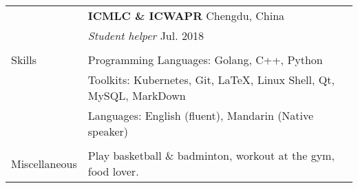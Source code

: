 \documentclass[letterpaper, 11pt]{article}
\begin{document}
\begin{longtable}{p{1in}p{5in}}
& \textbf{ICMLC \& ICWAPR} \hfill Chengdu, China \\
& \textit{Student helper} \hfill Jul. 2018 \\

& \\

\nohyphens{Skills}
& Programming Languages: Golang, C++, Python  \\
& Toolkits: Kubernetes, Git, \LaTeX, Linux Shell, Qt, MySQL, MarkDown \\
& Languages: English (fluent), Mandarin (Native speaker) \\
& \\


\nohyphens{Miscellaneous}
& Play basketball \& badminton, workout at the gym, food lover. \\


\end{longtable}
\end{document}
